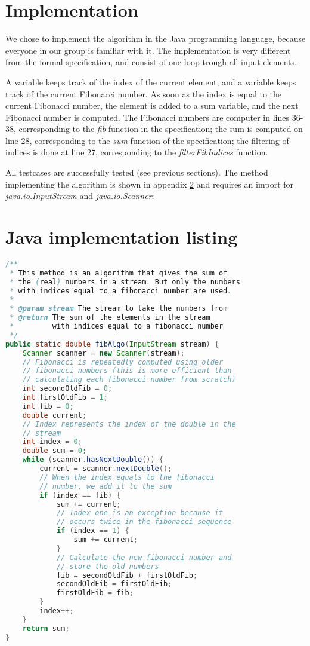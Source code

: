 \documentclass[12pt]{article}
\begin{document}
\section{Implementation}
We chose to implement the algorithm in the Java programming language, because everyone in our group is familiar with it. The implementation is very different from the formal specification, and consist of one loop trough all input elements.

A variable keeps track of the index of the current element, and a variable keeps track of the current Fibonacci number. As soon as the index is equal to the current Fibonacci number, the element is added to a sum variable, and the next Fibonacci number is computed. The Fibonacci numbers are computer in lines 36-38, corresponding to the \textsl{fib} function in the specification; the sum is computed on line 28, corresponding to the \textsl{sum} function of the specification; the filtering of indices is done at line 27, corresponding to the \textsl{filterFibIndices} function.

All testcases are successfully tested (see previous sections). The method implementing the algorithm is shown in appendix \ref{codelisting} and requires an import for \\ \textsl{java.io.InputStream} and \textsl{java.io.Scanner}:

\appendix

\section{Java implementation listing}
\label{codelisting}
\begin{lstlisting}[language=java]
/**
 * This method is an algorithm that gives the sum of
 * the (real) numbers in a stream. But only the numbers
 * with indices equal to a fibonacci number are used.
 *
 * @param stream The stream to take the numbers from
 * @return The sum of the elements in the stream
 *         with indices equal to a fibonacci number
 */
public static double fibAlgo(InputStream stream) {
    Scanner scanner = new Scanner(stream);
    // Fibonacci is repeatedly computed using older
    // fibonacci numbers (this is more efficient than
    // calculating each fibonacci number from scratch)
    int secondOldFib = 0;
    int firstOldFib = 1;
    int fib = 0;
    double current;
    // Index represents the index of the double in the
    // stream
    int index = 0;
    double sum = 0;
    while (scanner.hasNextDouble()) {
        current = scanner.nextDouble();
        // When the index equals to the fibonacci
        // number, we add it to the sum
        if (index == fib) {
            sum += current;
            // Index one is an exception because it
            // occurs twice in the fibonacci sequence
            if (index == 1) {
                sum += current;
            }
            // Calculate the new fibonacci number and
            // store the old numbers
            fib = secondOldFib + firstOldFib;
            secondOldFib = firstOldFib;
            firstOldFib = fib;
        }
        index++;
    }
    return sum;
}
\end{lstlisting}
\end{document}
